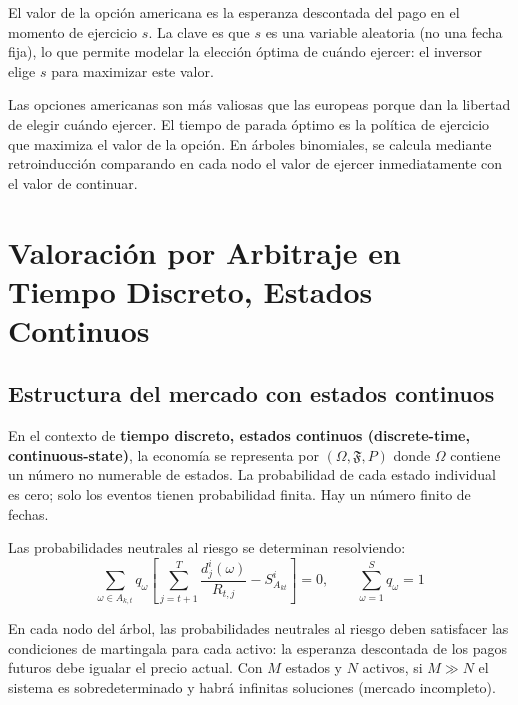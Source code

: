 \documentclass[12pt]{article}
\begin{document}
\begin{intuicionmat}
El valor de la opci\'on americana es la esperanza descontada del pago en el momento de ejercicio $s$. La clave es que $s$ es una variable aleatoria (no una fecha fija), lo que permite modelar la elecci\'on \'optima de cu\'ando ejercer: el inversor elige $s$ para maximizar este valor.
\end{intuicionmat}

\begin{intuicion}
Las opciones americanas son m\'as valiosas que las europeas porque dan la libertad de elegir cu\'ando ejercer. El tiempo de parada \'optimo es la pol\'itica de ejercicio que maximiza el valor de la opci\'on. En \'arboles binomiales, se calcula mediante retroinducci\'on comparando en cada nodo el valor de ejercer inmediatamente con el valor de continuar.
\end{intuicion}

\section{Valoraci\'on por Arbitraje en Tiempo Discreto, Estados Continuos}

\subsection{Estructura del mercado con estados continuos}

En el contexto de \textbf{tiempo discreto, estados continuos (discrete-time, continuous-state)}, la econom\'ia se representa por $(\Omega, \mathfrak{F}, P)$ donde $\Omega$ contiene un n\'umero no numerable de estados. La probabilidad de cada estado individual es cero; solo los eventos tienen probabilidad finita. Hay un n\'umero finito de fechas.

Las probabilidades neutrales al riesgo se determinan resolviendo:
\begin{equation}
    \sum_{\omega \in A_{k,t}} q_\omega \left[\sum_{j=t+1}^{T} \frac{d_j^i(\omega)}{R_{t,j}} - S^i_{A_{kt}}\right] = 0, \qquad \sum_{\omega=1}^{S} q_\omega = 1
\end{equation}

\begin{intuicionmat}
En cada nodo del \'arbol, las probabilidades neutrales al riesgo deben satisfacer las condiciones de martingala para cada activo: la esperanza descontada de los pagos futuros debe igualar el precio actual. Con $M$ estados y $N$ activos, si $M \gg N$ el sistema es sobredeterminado y habr\'a infinitas soluciones (mercado incompleto).
\end{intuicionmat}
\end{document}
